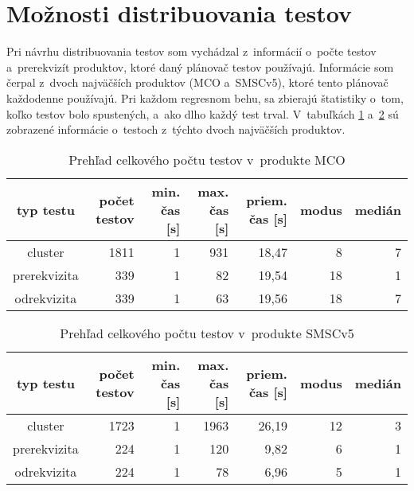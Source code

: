 \section{Možnosti distribuovania testov}
\label{sekcia:moznosti_distribuovania}
Pri návrhu distribuovania testov som vychádzal z~informácií o~počte testov a~prerekvizít produktov,
ktoré daný plánovač testov používajú. Informácie som čerpal z~dvoch najväčších produktov (MCO a~SMSCv5), 
ktoré tento plánovač každodenne používajú. Pri každom regresnom behu, sa zbierajú štatistiky o~tom,
koľko testov bolo spustených, a~ako dlho každý test trval. 
V~tabuľkách \ref{tabulka:testy_mco} a~\ref{tabulka:testy_smscv5} sú zobrazené informácie o~testoch z~týchto dvoch najväčších produktov.

\begin{table}
  \begin{center}
    \begin{tabular}{| c | r | r | r | r | r | r |}
    \hline
    typ testu & počet testov & min. čas [s] & max. čas [s] & priem. čas [s] & modus & medián \\ \hline
    cluster      & 1811 & 1 & 931 & 18,47 & 8  & 7 \\ \hline
    prerekvizita & 339  & 1 & 82  & 19,54 & 18 & 1 \\ \hline
    odrekvizita  & 339  & 1 & 63  & 19,56 & 18 & 7 \\
    \hline
    \end{tabular}
    \label{tabulka:testy_mco}
    \caption{Prehľad celkového počtu testov v~produkte MCO}
  \end{center}
\end{table}

\begin{table}
  \begin{center}
    \begin{tabular}{| c | r | r | r | r | r | r |}
    \hline
    typ testu & počet testov & min. čas [s] & max. čas [s] & priem. čas [s] & modus & medián \\ \hline
    cluster      & 1723 & 1 & 1963 & 26,19 & 12 & 3 \\ \hline
    prerekvizita & 224  & 1 & 120  & 9,82  & 6  & 1 \\ \hline
    odrekvizita  & 224  & 1 & 78   & 6,96  & 5  & 1 \\
    \hline
    \end{tabular}
    \label{tabulka:testy_smscv5}
    \caption{Prehľad celkového počtu testov v~produkte SMSCv5}
  \end{center}
\end{table}

